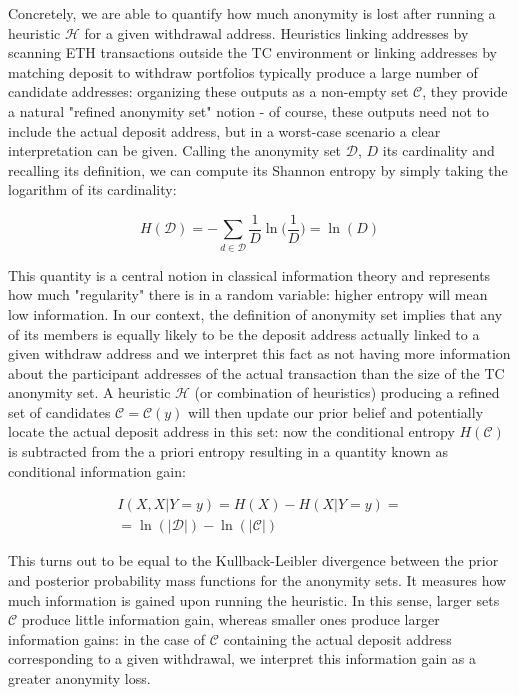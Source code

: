 Concretely, we are able to quantify how much anonymity is lost after running a heuristic $\mathcal{H}$ for a given withdrawal address. Heuristics linking addresses by scanning ETH transactions outside the TC environment or linking addresses by matching deposit to withdraw portfolios typically produce a large number of candidate addresses: organizing these outputs as a non-empty set $\mathcal{C}$, they provide a natural "refined anonymity set" notion - of course, these outputs need not to include the actual deposit address, but in a worst-case scenario a clear interpretation can be given. Calling the anonymity set $\mathcal{D}$, $D$ its cardinality and recalling its definition, we can compute its Shannon entropy by simply taking the logarithm of its cardinality:

\begin{equation*}
H(\mathcal{D})=-\sum\limits_{d\in\mathcal{D}}{\frac{1}{D}\ln\Big(\frac{1}{D}\Big)}=\ln(D)
\end{equation*} 

This quantity is a central notion in classical information theory and represents how much "regularity" there is in a random variable: higher entropy will mean low information. In our context, the definition of anonymity set implies that any of its members is equally likely to be the deposit address actually linked to a given withdraw address and we interpret this fact as not having more information about the participant addresses of the actual transaction than the size of the TC anonymity set. A heuristic $\mathcal{H}$ (or combination of heuristics) producing a refined set of candidates $\mathcal{C}=\mathcal{C}(y)$ will then update our prior belief and potentially locate the actual deposit address in this set: now the conditional entropy $H(\mathcal{C})$ is subtracted from the a priori entropy resulting in a quantity known as conditional information gain:

\begin{equation*} 
\begin{aligned}
  I(X,X|Y=y)=H(X)-H(X|Y=y)=\\ =\ln(\lvert \mathcal{D}\rvert)-\ln(\lvert \mathcal{C}\rvert)
\end{aligned}
\end{equation*}

 This turns out to be equal to the Kullback-Leibler divergence between the prior and posterior probability mass functions for the anonymity sets. It measures how much information is gained upon running the heuristic. In this sense, larger sets $\mathcal{C}$ produce little information gain, whereas smaller ones produce larger information gains: in the case of $\mathcal{C}$ containing the actual deposit address corresponding to a given withdrawal, we interpret this information gain as a greater anonymity loss.